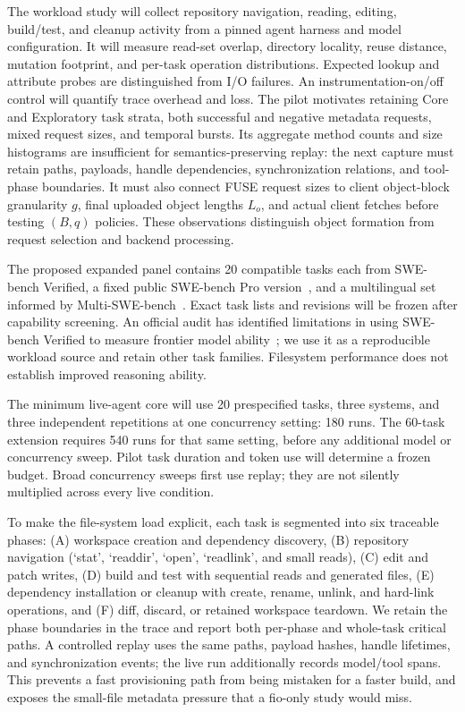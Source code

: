  The workload study will collect repository navigation, reading,
editing, build/test, and cleanup activity from a pinned agent harness and
model configuration. It will measure read-set overlap, directory locality,
reuse distance, mutation footprint, and per-task operation distributions.
Expected lookup and attribute probes are distinguished from I/O failures.
An instrumentation-on/off control will quantify trace overhead and loss.
The pilot motivates retaining Core and Exploratory task strata, both
successful and negative metadata requests, mixed request sizes, and temporal
bursts. Its aggregate method counts and size histograms are insufficient for
semantics-preserving replay: the next capture must retain paths, payloads,
handle dependencies, synchronization relations, and tool-phase boundaries.
It must also connect FUSE request sizes to client object-block granularity
$g$, final uploaded object lengths $L_o$, and actual client fetches before
testing $(B,q)$ policies. These observations distinguish object formation
from request selection and backend processing.

The proposed expanded panel contains 20 compatible tasks each from
SWE-bench Verified, a fixed public SWE-bench Pro version~\cite{swebench_pro_v2}, and a multilingual
set informed by Multi-SWE-bench~\cite{swebench2024,multi_swebench2025}.
Exact task lists and revisions will be frozen after capability screening.
An official audit has identified limitations in using SWE-bench Verified
to measure frontier model ability~\cite{swebench_audit2026}; we use it as a
reproducible workload source and retain other task families. Filesystem
performance does not establish improved reasoning ability.

The minimum live-agent core will use 20 prespecified tasks, three systems,
and three independent repetitions at one concurrency setting: 180 runs.
The 60-task extension requires 540 runs for that same setting, before any
additional model or concurrency sweep. Pilot task duration and token use
will determine a frozen budget. Broad concurrency sweeps first use replay;
they are not silently multiplied across every live condition.

To make the file-system load explicit, each task is segmented into six
traceable phases: (A) workspace creation and dependency discovery, (B)
repository navigation (`stat', `readdir', `open', `readlink', and small
reads), (C) edit and patch writes, (D) build and test with sequential reads
and generated files, (E) dependency installation or cleanup with create,
rename, unlink, and hard-link operations, and (F) diff, discard, or retained
workspace teardown. We retain the phase boundaries in the trace and report
both per-phase and whole-task critical paths. A controlled replay uses the
same paths, payload hashes, handle lifetimes, and synchronization events;
the live run additionally records model/tool spans. This prevents a fast
provisioning path from being mistaken for a faster build, and exposes the
small-file metadata pressure that a fio-only study would miss.

